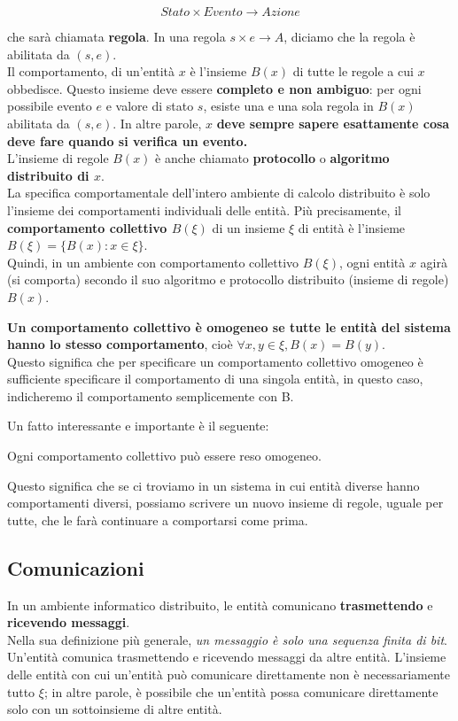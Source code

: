 $$
    Stato \times Evento \rightarrow Azione
$$

che sarà chiamata \textbf{regola}. In una regola $s \times e \rightarrow A$,
diciamo che la regola è abilitata da $(s, e)$.\\
Il comportamento, di un'entità $x$ è l'insieme $B(x)$ di tutte le regole a cui
$x$ obbedisce. Questo insieme deve essere \textbf{completo e non ambiguo}: per
ogni possibile evento $e$ e valore di stato $s$, esiste una e una sola regola in
$B(x)$ abilitata da $(s,e)$. In altre parole, $x$ \textbf{deve sempre sapere
    esattamente cosa deve fare quando si verifica un evento.}\\
L'insieme di regole $B(x)$ è anche chiamato \textbf{protocollo} o
\textbf{algoritmo distribuito di $x$}.\\
La specifica comportamentale dell'intero ambiente di calcolo distribuito è solo
l'insieme dei comportamenti individuali delle entità. Più precisamente, il
\textbf{comportamento collettivo $B(\xi)$} di un insieme $\xi$ di entità è
l'insieme $B(\xi) = \{B(x): x \in \xi\}$.\\
Quindi, in un ambiente con comportamento collettivo $B(\xi)$, ogni entità $x$
agirà (si comporta) secondo il suo algoritmo e protocollo distribuito (insieme
di regole) $B(x)$.

\textbf{Un comportamento collettivo è omogeneo se tutte le entità del sistema
    hanno lo stesso comportamento}, cioè $\forall x, y \in \xi, B(x) = B(y)$.\\
Questo significa che per specificare un comportamento collettivo omogeneo è
sufficiente specificare il comportamento di una singola entità, in questo caso,
indicheremo il comportamento semplicemente con B.

Un fatto interessante e importante è il seguente:

\begin{prop}
    Ogni comportamento collettivo può essere reso
    omogeneo.
\end{prop}

Questo significa che se ci troviamo in un sistema in cui entità diverse hanno
comportamenti diversi, possiamo scrivere un nuovo insieme di regole, uguale per
tutte, che le farà continuare a comportarsi come prima.

\subsection{Comunicazioni}
In un ambiente informatico distribuito, le entità comunicano
\textbf{trasmettendo} e \textbf{ricevendo messaggi}.\\
Nella sua definizione più generale, \textit{un messaggio è solo una sequenza
    finita di bit}.\\
Un'entità comunica trasmettendo e ricevendo messaggi da altre entità. L'insieme
delle entità con cui un'entità può comunicare direttamente non è necessariamente
tutto $\xi$; in altre parole, è possibile che un'entità possa comunicare
direttamente solo con un sottoinsieme di altre entità.

